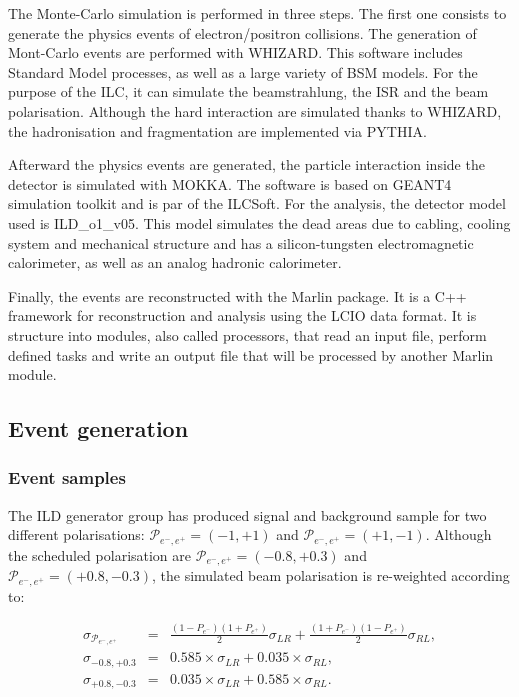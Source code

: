     The Monte-Carlo simulation is performed in three steps.
    The first one consists to generate the physics events of electron/positron collisions.
    The generation of Mont-Carlo events are performed with WHIZARD.
    This software includes Standard Model processes, as well as a large variety of BSM models.
    For the purpose of the \gls{ILC}, it can simulate the beamstrahlung, the \gls{ISR} and the beam polarisation.
    Although the hard interaction are simulated thanks to WHIZARD, the hadronisation and fragmentation are implemented via PYTHIA.
    
    Afterward the physics events are generated, the particle interaction inside the detector is simulated with MOKKA.
    The software is based on GEANT4 simulation toolkit and is par of the ILCSoft.
    For the analysis, the detector model used is ILD\_o1\_v05.
    This model simulates the dead areas due to cabling, cooling system and mechanical structure and has a silicon-tungsten electromagnetic calorimeter, as well as an analog hadronic calorimeter.
    
    Finally, the events are reconstructed with the \gls{Marlin} package.
    It is a C++ framework for reconstruction and analysis using the LCIO data format.
    It is structure into modules, also called processors, that read an input file, perform defined tasks and write an output file that will be processed by another \gls{Marlin} module.

  \subsection{Event generation}
     
     \subsubsection{Event samples}

     The \gls{ILD} generator group has produced signal and background sample for two different polarisations:  $\mathcal{P}_{e^-,e^+} = (-1,+1)$ and $\mathcal{P}_{e^-,e^+} = (+1,-1)$.
     Although the scheduled polarisation are $\mathcal{P}_{e^-,e^+} = (-0.8,+0.3)$ and  $\mathcal{P}_{e^-,e^+} = (+0.8,-0.3)$, the simulated beam polarisation is re-weighted according to:
     
     \begin{equation}
       \begin{array}{lrc}
       \sigma_{\mathcal{P}_{e^-,e^+}} & = & \frac{(1 - P_{e^-})(1+P_{e^+})}{2} \sigma_{LR} + \frac{(1+P_{e^-})(1-P_{e^+})}{2} \sigma_{RL}, \\
       \sigma_{-0.8,+0.3} & = & 0.585 \times \sigma_{LR} + 0.035 \times \sigma_{RL}, \\
       \sigma_{+0.8,-0.3} & = & 0.035 \times \sigma_{LR} + 0.585 \times \sigma_{RL}.
       \end{array}
     \end{equation}

